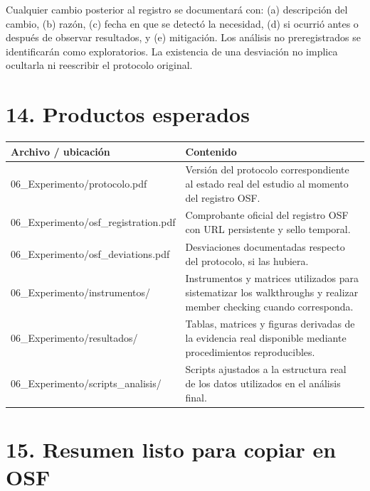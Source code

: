 \documentclass[9pt,a4paper]{extarticle}
\begin{document}
Cualquier cambio posterior al registro se documentará con: (a) descripción del cambio, (b) razón, (c) fecha en que se detectó la necesidad, (d) si ocurrió antes o después de observar resultados, y (e) mitigación. Los análisis no preregistrados se identificarán como exploratorios. La existencia de una desviación no implica ocultarla ni reescribir el protocolo original.

\section*{14. Productos esperados}

\begin{longtable}{@{}p{}p{}@{}}
\toprule
\textbf{Archivo / ubicación} & \textbf{Contenido} \\
\midrule
\endhead
06\_Experimento/protocolo.pdf & Versión del protocolo correspondiente al estado real del estudio al momento del registro OSF. \\
06\_Experimento/osf\_registration.pdf & Comprobante oficial del registro OSF con URL persistente y sello temporal. \\
06\_Experimento/osf\_deviations.pdf & Desviaciones documentadas respecto del protocolo, si las hubiera. \\
06\_Experimento/instrumentos/ & Instrumentos y matrices utilizados para sistematizar los walkthroughs y realizar member checking cuando corresponda. \\
06\_Experimento/resultados/ & Tablas, matrices y figuras derivadas de la evidencia real disponible mediante procedimientos reproducibles. \\
06\_Experimento/scripts\_analisis/ & Scripts ajustados a la estructura real de los datos utilizados en el análisis final. \\
\bottomrule
\end{longtable}

\section*{15. Resumen listo para copiar en OSF}
\end{document}
